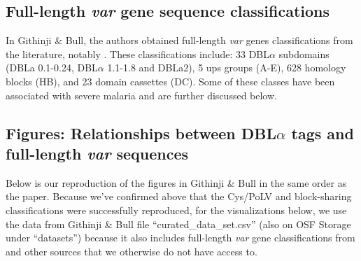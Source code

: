 \documentclass[10pt,twocolumn,superscriptaddress]{revtex4-1}
\newcommand{\var}{{\it var}\xspace}
\newcommand{\dbla}{{DBL$\alpha$}\xspace}
\newcommand{\cp}{{Cys/PoLV}\xspace}
\newcommand{\paper}{{Githinji \& Bull}\xspace}
\begin{document}
\subsection{Full-length \var gene sequence classifications}
In \paper \cite{githinji2017}, the authors obtained full-length \var genes classifications from the literature, notably \cite{rask2010}. These classifications include: 33 \dbla subdomains (DBLa 0.1-0.24, \dbla 1.1-1.8 and DBLa2), 5 ups groups (A-E), 628 homology blocks (HB), and 23 domain cassettes (DC). Some of these classes have been associated with severe malaria and are further discussed below. 

\subsection{Figures: Relationships between \dbla tags and full-length \var sequences}
Below is our reproduction of the figures in \paper in the same order as the paper. Because we've confirmed above that the \cp and block-sharing classifications were successfully reproduced, for the visualizations below, we use the data from \paper file ``curated\_data\_set.csv'' (also on OSF Storage under ``datasets'') because it also includes full-length \var gene classifications from \cite{rask2010} and other sources that we otherwise do not have access to. 
\end{document}
